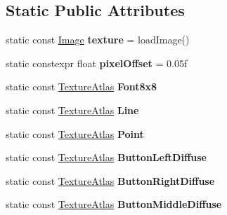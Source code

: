 \subsection*{Static Public Attributes}
\begin{DoxyCompactItemize}
\item 
\hypertarget{classTextureAtlas_a0980d47e7d18e1e22e3c8a6df22a0f01}{static const \hyperlink{classImage}{Image} {\bfseries texture} = load\+Image()}\label{classTextureAtlas_a0980d47e7d18e1e22e3c8a6df22a0f01}

\item 
\hypertarget{classTextureAtlas_af2e14712c23efb5aaa1c38b11af6d847}{static constexpr float {\bfseries pixel\+Offset} = 0.\+05f}\label{classTextureAtlas_af2e14712c23efb5aaa1c38b11af6d847}

\item 
\hypertarget{classTextureAtlas_a0cf72eb78cbcfea76a9651dfe7ee0c88}{static const \hyperlink{classTextureAtlas}{Texture\+Atlas} {\bfseries Font8x8}}\label{classTextureAtlas_a0cf72eb78cbcfea76a9651dfe7ee0c88}

\item 
\hypertarget{classTextureAtlas_a4296dc62e2df77b079d742514d730322}{static const \hyperlink{classTextureAtlas}{Texture\+Atlas} {\bfseries Line}}\label{classTextureAtlas_a4296dc62e2df77b079d742514d730322}

\item 
\hypertarget{classTextureAtlas_a8d23d56a964289978500e69b2f5da9d7}{static const \hyperlink{classTextureAtlas}{Texture\+Atlas} {\bfseries Point}}\label{classTextureAtlas_a8d23d56a964289978500e69b2f5da9d7}

\item 
\hypertarget{classTextureAtlas_a5de4d8256c307baf190b716165b55676}{static const \hyperlink{classTextureAtlas}{Texture\+Atlas} {\bfseries Button\+Left\+Diffuse}}\label{classTextureAtlas_a5de4d8256c307baf190b716165b55676}

\item 
\hypertarget{classTextureAtlas_a2ac1de24e854660b7719778fb2c34b05}{static const \hyperlink{classTextureAtlas}{Texture\+Atlas} {\bfseries Button\+Right\+Diffuse}}\label{classTextureAtlas_a2ac1de24e854660b7719778fb2c34b05}

\item 
\hypertarget{classTextureAtlas_a3cd755976a35facb8f1902227521d67e}{static const \hyperlink{classTextureAtlas}{Texture\+Atlas} {\bfseries Button\+Middle\+Diffuse}}\label{classTextureAtlas_a3cd755976a35facb8f1902227521d67e}


\end{DoxyCompactItemize}
